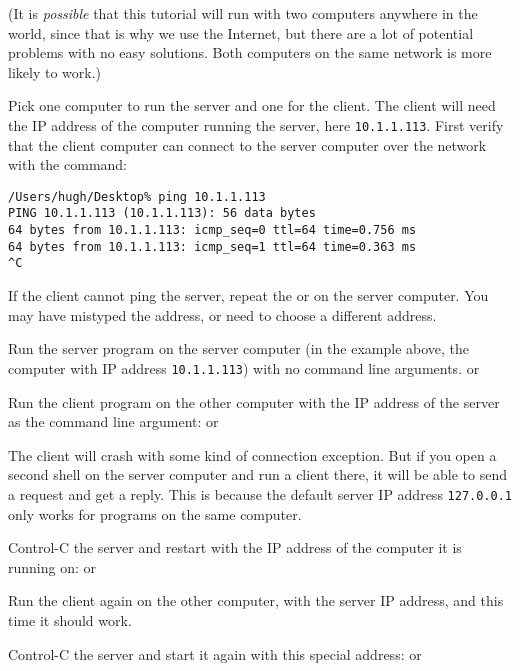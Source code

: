 (It is \emph{possible} that this tutorial will run with two computers anywhere in the world,
since that is why we use the Internet, but there are a lot of potential problems
with no easy solutions. Both computers on the same network is more likely to work.)

Pick one computer to run the server and one for the client. The client will need the IP
address of the computer running the server, here \texttt{10.1.1.113}.
First verify that the client computer can
connect to the server computer over the network with the  command:

\begin{CODE}\begin{verbatim}
/Users/hugh/Desktop% ping 10.1.1.113
PING 10.1.1.113 (10.1.1.113): 56 data bytes
64 bytes from 10.1.1.113: icmp_seq=0 ttl=64 time=0.756 ms
64 bytes from 10.1.1.113: icmp_seq=1 ttl=64 time=0.363 ms
^C
\end{verbatim}\end{CODE}

If the client cannot ping the server, repeat the  or  on
the server computer. You may have mistyped the address, or need to choose a different address.

\STEP Run the server program on the server computer (in the example above, the computer
with IP address \texttt{10.1.1.113}) with no command line arguments.
or

Run the client program on the other computer with the IP address of the server
as the command line argument:
or

The client will crash with some kind of connection exception. But if you open a second
shell on the server computer and run a client there, it will be able to send a request
and get a reply.
This is because the default server IP address \texttt{127.0.0.1}
only works for programs on the same computer.

\STEP Control-C the server and restart with the IP address of the computer it is running on:
or

Run the client again on the other computer, with the server IP address, and this time
it should work.

\STEP Control-C the server and start it again with this special address:
or

